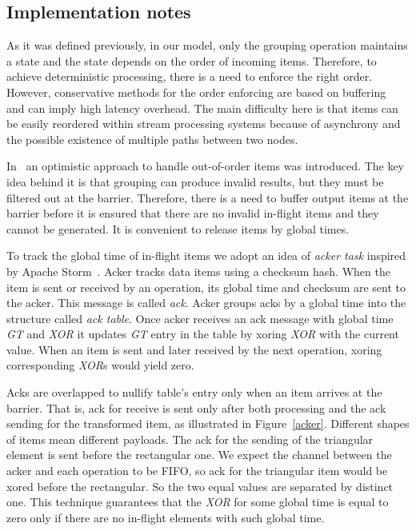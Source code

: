 \subsection{Implementation notes}

As it was defined previously, in our model, only the grouping operation maintains a state and the state depends on the order of incoming items. Therefore, to achieve deterministic processing, there is a need to enforce the right order. However, conservative methods for the order enforcing are based on buffering~\cite{Li:2008:OPN:1453856.1453890} and can imply high latency overhead. The main difficulty here is that items can be easily reordered within stream processing systems because of asynchrony and the possible existence of multiple paths between two nodes. 

In~\cite{hiddenSeim} an optimistic approach to handle out-of-order items was introduced. The key idea behind it is that grouping can produce invalid results, but they must be filtered out at the barrier. Therefore, there is a need to buffer output items at the barrier before it is ensured that there are no invalid in-flight items and they cannot be generated. It is convenient to release items by global times.

To track the global time of in-flight items we adopt an idea of {\it acker task} inspired by Apache Storm~\cite{apache:storm}. Acker tracks data items using a checksum hash. When the item is sent or received by an operation, its global time and checksum are sent to the acker. This message is called {\it ack}. Acker groups acks by a global time into the structure called {\it ack table}. Once acker receives an ack message with global time {\it GT} and {\it XOR} it updates {\it GT} entry in the table by xoring {\it XOR} with the current value. When an item is sent and later received by the next operation, xoring corresponding {\it XOR}s would yield zero.

Acks are overlapped to nullify table's entry only when an item arrives at the barrier. That is, ack for receive is sent only after both processing and the ack sending for the transformed item, as illustrated in Figure~\ref{acker}. Different shapes of items mean different payloads. The ack for the sending of the triangular element is sent before the rectangular one. We expect the channel between the acker and each operation to be FIFO, so ack for the triangular item would be xored before the rectangular. So the two equal values are separated by distinct one. This technique guarantees that the {\it XOR} for some global time is equal to zero only if there are no in-flight elements with such global time.

